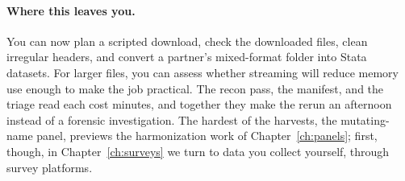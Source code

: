 \paragraph{Where this leaves you.} You can now plan a scripted download, check the downloaded files, clean irregular headers, and convert a partner's mixed-format folder into Stata datasets. For larger files, you can assess whether streaming will reduce memory use enough to make the job practical. The recon pass, the manifest, and the triage read each cost minutes, and together they make the rerun an afternoon instead of a forensic investigation. The hardest of the harvests, the mutating-name panel, previews the harmonization work of Chapter~\ref{ch:panels}; first, though, in Chapter~\ref{ch:surveys} we turn to data you collect yourself, through survey platforms.

